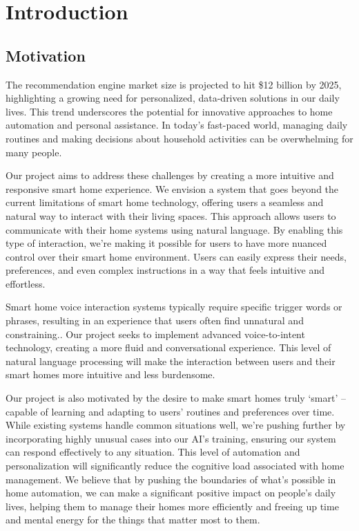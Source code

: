\documentclass[conference]{IEEEtran}
\begin{document}
\newpage
\section{Introduction}

\vspace{1em} %

\subsection{Motivation}
\vspace{0.5em}

The recommendation engine market size is projected to hit \$12 billion by 2025, highlighting a growing need for personalized, data-driven solutions in our daily lives. This trend underscores the potential for innovative approaches to home automation and personal assistance. In today's fast-paced world, managing daily routines and making decisions about household activities can be overwhelming for many people.

Our project aims to address these challenges by creating a more intuitive and responsive smart home experience. We envision a system that goes beyond the current limitations of smart home technology, offering users a seamless and natural way to interact with their living spaces. This approach allows users to communicate with their home systems using natural language. By enabling this type of interaction, we're making it possible for users to have more nuanced control over their smart home environment. Users can easily express their needs, preferences, and even complex instructions in a way that feels intuitive and effortless.

Smart home voice interaction systems typically require specific trigger words or phrases, resulting in an experience that users often find unnatural and constraining.. Our project seeks to implement advanced voice-to-intent technology, creating a more fluid and conversational experience. This level of natural language processing will make the interaction between users and their smart homes more intuitive and less burdensome. 

Our project is also motivated by the desire to make smart homes truly ‘smart’ – capable of learning and adapting to users' routines and preferences over time. While existing systems handle common situations well, we're pushing further by incorporating highly unusual cases into our AI's training, ensuring our system can respond effectively to any situation. This level of automation and personalization will significantly reduce the cognitive load associated with home management. We believe that by pushing the boundaries of what's possible in home automation, we can make a significant positive impact on people's daily lives, helping them to manage their homes more efficiently and freeing up time and mental energy for the things that matter most to them.
\end{document}
